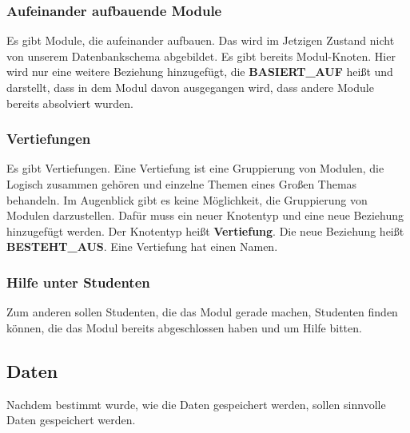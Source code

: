 \vspace{12pt}

\subsubsection{Aufeinander aufbauende Module}
Es gibt Module, die aufeinander aufbauen. Das wird im Jetzigen Zustand nicht von unserem Datenbankschema abgebildet. Es gibt bereits Modul-Knoten. Hier wird nur eine weitere Beziehung hinzugefügt, die \textbf{BASIERT\_AUF} heißt und darstellt, dass in dem Modul davon ausgegangen wird, dass andere Module bereits absolviert wurden.

\vspace{12pt}

\subsubsection{Vertiefungen}
Es gibt Vertiefungen. Eine Vertiefung ist eine Gruppierung von Modulen, die Logisch zusammen gehören und einzelne Themen eines Großen Themas behandeln. Im Augenblick gibt es keine Möglichkeit, die Gruppierung von Modulen darzustellen. Dafür muss ein neuer Knotentyp und eine neue Beziehung hinzugefügt werden. Der Knotentyp heißt \textbf{Vertiefung}. Die neue Beziehung heißt \textbf{BESTEHT\_AUS}. Eine Vertiefung hat einen Namen.

\vspace{12pt}

\subsubsection{Hilfe unter Studenten}
Zum anderen sollen Studenten, die das Modul gerade machen, Studenten finden können, die das Modul bereits abgeschlossen haben und um Hilfe bitten.

\newpage

\subsection{Daten}
Nachdem bestimmt wurde, wie die Daten gespeichert werden, sollen sinnvolle Daten gespeichert werden.
